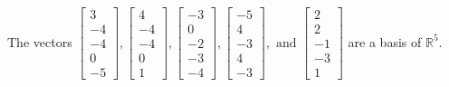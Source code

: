 \begin{exercise}
\begin{exerciseStatement}
  \end{exerciseStatement}
  \begin{exerciseAnswer}
   The vectors \(\left[\begin{array}{r}
3 \\
-4 \\
-4 \\
0 \\
-5
\end{array}\right] , \left[\begin{array}{r}
4 \\
-4 \\
-4 \\
0 \\
1
\end{array}\right] , \left[\begin{array}{r}
-3 \\
0 \\
-2 \\
-3 \\
-4
\end{array}\right] , \left[\begin{array}{r}
-5 \\
4 \\
-3 \\
4 \\
-3
\end{array}\right] , \text{ and } \left[\begin{array}{r}
2 \\
2 \\
-1 \\
-3 \\
1
\end{array}\right]\) 
  	 are  a basis of \(\mathbb{R}^5\).
  


  \end{exerciseAnswer}
\end{exercise}
